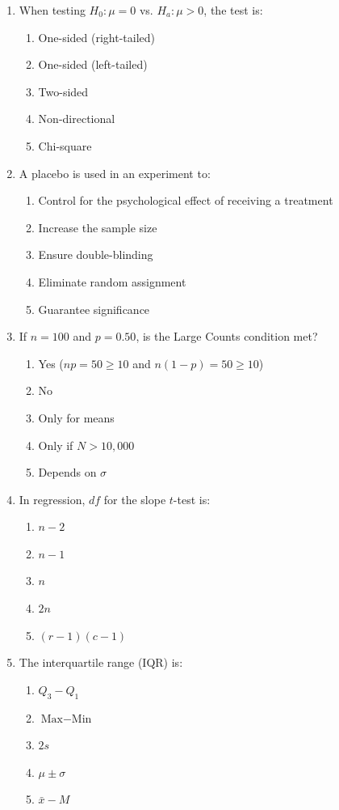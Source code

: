 \begin{enumerate}[resume, leftmargin=1.5em]
  \item When testing $H_0: \mu = 0$ vs. $H_a: \mu > 0$, the test is:
  \begin{enumerate}[label=(\Alph*)]
    \item One-sided (right-tailed) \item One-sided (left-tailed) \item Two-sided \item Non-directional \item Chi-square
  \end{enumerate}

  \item A placebo is used in an experiment to:
  \begin{enumerate}[label=(\Alph*)]
    \item Control for the psychological effect of receiving a treatment \item Increase the sample size \item Ensure double-blinding \item Eliminate random assignment \item Guarantee significance
  \end{enumerate}

  \item If $n = 100$ and $p = 0.50$, is the Large Counts condition met?
  \begin{enumerate}[label=(\Alph*)]
    \item Yes ($np = 50 \ge 10$ and $n(1-p) = 50 \ge 10$) \item No \item Only for means \item Only if $N > 10,000$ \item Depends on $\sigma$
  \end{enumerate}

  \item In regression, $df$ for the slope $t$-test is:
  \begin{enumerate}[label=(\Alph*)]
    \item $n - 2$ \item $n - 1$ \item $n$ \item $2n$ \item $(r-1)(c-1)$
  \end{enumerate}

  \item The interquartile range (IQR) is:
  \begin{enumerate}[label=(\Alph*)]
    \item $Q_3 - Q_1$ \item $\text{Max} - \text{Min}$ \item $2s$ \item $\mu \pm \sigma$ \item $\bar{x} - M$
  \end{enumerate}


\end{enumerate}
